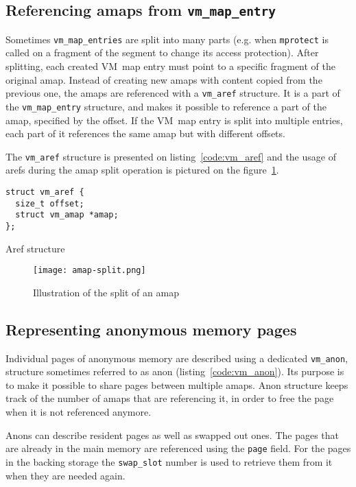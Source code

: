 \subsection{Referencing amaps from \texttt{vm_map_entry}}

Sometimes \texttt{vm_map_entries} are split into many parts
(e.g. when \texttt{mprotect} is called on a fragment of the segment to change its access protection).
After splitting, each created VM~map entry must point to a specific fragment of the original amap.
Instead of creating new amaps with content copied from the previous one, the amaps are referenced with a \texttt{vm_aref} structure.
It is a part of the \texttt{vm_map_entry} structure, and makes it possible to reference a part of the amap, specified by the offset.
If the VM~map entry is split into multiple entries, each part of it references the same amap but with different offsets.

The \texttt{vm_aref} structure is presented on listing~\ref{code:vm_aref}
and the usage of arefs during the amap split operation is pictured on the figure~\ref{img:amap_split}.

\begin{listing}[h]
  \begin{verbatim}
struct vm_aref {
  size_t offset;
  struct vm_amap *amap;
};
  \end{verbatim}
  \caption{Aref structure}
  \label{code:vm_aref}
\end{listing}

\begin{figure}[h]
  \centering
  \texttt{[image: amap-split.png]}
  \caption{Illustration of the split of an amap \cite{cranor}}
  \label{img:amap_split}
\end{figure}

\subsection{Representing anonymous memory pages}

Individual pages of anonymous memory are described using a dedicated \texttt{vm_anon}, structure sometimes referred to as anon (listing~\ref{code:vm_anon}).
Its purpose is to make it possible to share pages between multiple amaps.
Anon structure keeps track of the number of amaps that are referencing it, in order to free the page when it is not referenced anymore.

Anons can describe resident pages as well as swapped out ones.
The pages that are already in the main memory are referenced using the \texttt{page} field.
For the pages in the backing storage the \texttt{swap_slot} number is used to retrieve them from it when they are needed again.

